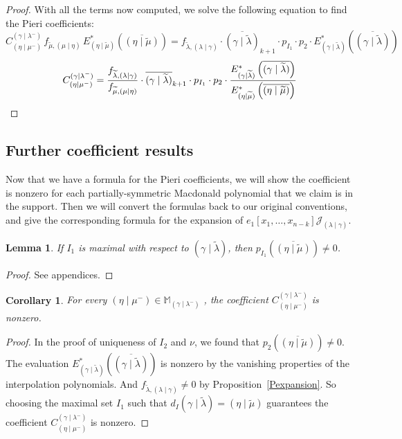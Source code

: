 \documentclass[11pt]{article}
\newtheorem{lemm}[theo]{Lemma}
\newtheorem{coro}[theo]{Corollary}
\theoremstyle{definition}
\numberwithin{equation}{section}
\newcommand{\Estar}[1]{E^*_{#1}}
\newcommand{\JJ}{\mathcal{J}_{(\lambda \mid \gamma)}}
\newcommand{\MM}{\mathbb{M}_{\gammalambdamin}}
\newcommand{\nudom}{{( \lambda \mid \gamma )}}
\newcommand{\lambdagamma}{{\nudom}}
\newcommand{\gammalambdamin}{{(\gamma \mid \lambda^-)}}
\newcommand{\etamu}{{(\eta \mid \mu^-)}}
\newcommand{\mueta}{{(\mu \mid \eta)}}
\newcommand{\mutilde}{{\widetilde{\mu}}}
\newcommand{\lambdatilde}{{\widetilde{\lambda}}}
\newcommand{\gammalambdatilde}{{(\gamma \mid \lambdatilde)}}
\newcommand{\flambdatilde}{f_{\lambdatilde , \lambdagamma}}
\newcommand{\etamutilde}{{(\eta \mid \widetilde{\mu})}}
\newcommand{\pIoneevaluated}{p_{I_1}\left(\overline{\etamutilde}\right)}
\newcommand{\pItwoevaluated}{p_{2}\left(\overline{\etamutilde}\right)}
\newcommand{\dI}{d_I}
\newcommand{\fmutilde}{f_{\mutilde, \mueta}}
\begin{document}
\begin{proof}
With all the terms now computed, we solve the following equation to find the Pieri coefficients:
\[
    C^{\gammalambdamin}_{\etamu}\, \fmutilde \,\Estar{\etamutilde} \left( \overline{\etamutilde}\right) = \flambdatilde \cdot \overline{\gammalambdatilde}_{k+1} \cdot p_{I_1} \cdot p_{2} \cdot \Estar{\gammalambdatilde}\left(\overline{\gammalambdatilde} \right)\]
   \[ C^{\gammalambdamin}_{\etamu} = \frac{\flambdatilde}{\fmutilde} \cdot \overline{\gammalambdatilde}_{k+1} \cdot p_{I_1} \cdot p_{2} \cdot \frac{\Estar{\gammalambdatilde}\left(\overline{\gammalambdatilde} \right)}{\Estar{\etamutilde} \left( \overline{\etamutilde}\right)}\qedhere
\]
\end{proof}
\vspace*{.3cm}

    
    \subsection{Further coefficient results}
Now that we have a formula for the Pieri coefficients, we will show the coefficient is nonzero for each partially-symmetric Macdonald polynomial that we claim is in the support. Then we will convert the formulas back to our original conventions, and give the corresponding formula for the expansion of $e_1[x_1,\dots, x_{n-k}] \JJ$.



\begin{lemm}\label{nonzero}
If $I_1$ is maximal with respect to $\gammalambdatilde$, then $\pIoneevaluated \neq 0$.
\end{lemm}
\begin{proof}
    See appendices.
\end{proof}

\begin{coro}\label{support}
For every $\etamu \in \MM$ , the coefficient $C^{\gammalambdamin}_{\etamu}$ is nonzero.
\end{coro}
\begin{proof}
In the proof of uniqueness of $I_2$ and $\nu$, we found that $\pItwoevaluated \neq 0$. The evaluation $\Estar{\gammalambdatilde} \left(\overline{\gammalambdatilde} \right)$ is nonzero by the vanishing properties of the interpolation polynomials. And $\flambdatilde \neq 0$ by Proposition~\ref{Pexpansion}. So choosing the maximal set $I_1$ such that $\dI{\gammalambdatilde} = \etamutilde$ guarantees the coefficient $C^\gammalambdamin_{\etamu}$ is nonzero.
\end{proof}
\end{document}
